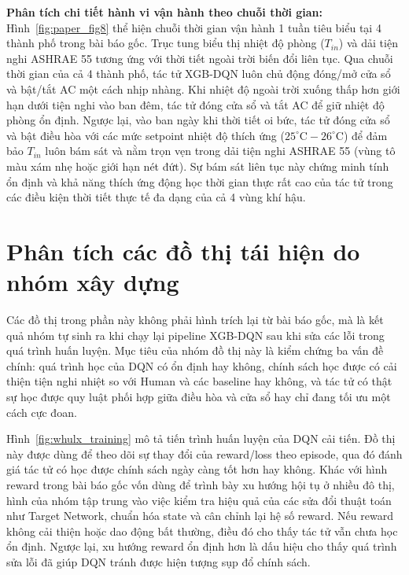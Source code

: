 \documentclass[12pt, a4paper]{report}
\begin{document}
\noindent
\textbf{Phân tích chi tiết hành vi vận hành theo chuỗi thời gian:}
Hình~\ref{fig:paper_fig8} thể hiện chuỗi thời gian vận hành 1 tuần tiêu biểu tại 4 thành phố trong bài báo gốc. Trục tung biểu thị nhiệt độ phòng ($T_{in}$) và dải tiện nghi ASHRAE 55 tương ứng với thời tiết ngoài trời biến đổi liên tục.
Qua chuỗi thời gian của cả 4 thành phố, tác tử XGB-DQN luôn chủ động đóng/mở cửa sổ và bật/tắt AC một cách nhịp nhàng. Khi nhiệt độ ngoài trời xuống thấp hơn giới hạn dưới tiện nghi vào ban đêm, tác tử đóng cửa sổ và tắt AC để giữ nhiệt độ phòng ổn định. Ngược lại, vào ban ngày khi thời tiết oi bức, tác tử đóng cửa sổ và bật điều hòa với các mức setpoint nhiệt độ thích ứng ($25^\circ\text{C} - 26^\circ\text{C}$) để đảm bảo $T_{in}$ luôn bám sát và nằm trọn vẹn trong dải tiện nghi ASHRAE 55 (vùng tô màu xám nhẹ hoặc giới hạn nét đứt). Sự bám sát liên tục này chứng minh tính ổn định và khả năng thích ứng động học thời gian thực rất cao của tác tử trong các điều kiện thời tiết thực tế đa dạng của cả 4 vùng khí hậu.

\FloatBarrier
\section{Phân tích các đồ thị tái hiện do nhóm xây dựng}

Các đồ thị trong phần này không phải hình trích lại từ bài báo gốc, mà là kết quả nhóm tự sinh ra khi chạy lại pipeline XGB-DQN sau khi sửa các lỗi trong quá trình huấn luyện. Mục tiêu của nhóm đồ thị này là kiểm chứng ba vấn đề chính: quá trình học của DQN có ổn định hay không, chính sách học được có cải thiện tiện nghi nhiệt so với Human và các baseline hay không, và tác tử có thật sự học được quy luật phối hợp giữa điều hòa và cửa sổ hay chỉ đang tối ưu một cách cực đoan.

Hình~\ref{fig:whulx_training} mô tả tiến trình huấn luyện của DQN cải tiến. Đồ thị này được dùng để theo dõi sự thay đổi của reward/loss theo episode, qua đó đánh giá tác tử có học được chính sách ngày càng tốt hơn hay không. Khác với hình reward trong bài báo gốc vốn dùng để trình bày xu hướng hội tụ ở nhiều đô thị, hình của nhóm tập trung vào việc kiểm tra hiệu quả của các sửa đổi thuật toán như Target Network, chuẩn hóa state và cân chỉnh lại hệ số reward. Nếu reward không cải thiện hoặc dao động bất thường, điều đó cho thấy tác tử vẫn chưa học ổn định. Ngược lại, xu hướng reward ổn định hơn là dấu hiệu cho thấy quá trình sửa lỗi đã giúp DQN tránh được hiện tượng sụp đổ chính sách.
\end{document}
